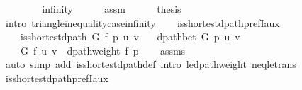 \begin{isabellebody}
\ \ \isamarkupfalse%
\isanewline
\ \ \ \ \isamarkupfalse%
\ infinity\isanewline
\ \ \ \ \isamarkupfalse%
\ assm\isanewline
\ \ \ \ \isamarkupfalse%
\ {\isacharquery}{\kern0pt}thesis\isanewline
\ \ \ \ \ \ \isamarkupfalse%
\ {\isacharparenleft}{\kern0pt}intro\ {\isasymdelta}{\isacharunderscore}{\kern0pt}triangle{\isacharunderscore}{\kern0pt}inequality{\isacharunderscore}{\kern0pt}case{\isacharunderscore}{\kern0pt}infinity{\isacharparenright}{\kern0pt}\isanewline
\ \ \isamarkupfalse%
\isanewline
{}\isamarkupfalse%
%
\endisatagproof
{\isafoldproof}%
%
\isadelimproof
\isanewline
%
\endisadelimproof
%
\isadeliminvisible
\isanewline
%
\endisadeliminvisible
%
\isataginvisible
{}\isamarkupfalse%
\ is{\isacharunderscore}{\kern0pt}shortest{\isacharunderscore}{\kern0pt}dpath{\isacharunderscore}{\kern0pt}prefI{\isacharunderscore}{\kern0pt}aux{\isacharcolon}{\kern0pt}\isanewline
\ \ \ {\isachardoublequoteopen}{\isasymnot}\ is{\isacharunderscore}{\kern0pt}shortest{\isacharunderscore}{\kern0pt}dpath\ G\ f\ p\ u\ v{\isachardoublequoteclose}\isanewline
\ \ \ {\isachardoublequoteopen}dpath{\isacharunderscore}{\kern0pt}bet\ G\ p\ u\ v{\isachardoublequoteclose}\isanewline
\ \ \ {\isachardoublequoteopen}{\isasymdelta}\ G\ f\ u\ v\ {\isacharless}{\kern0pt}\ dpath{\isacharunderscore}{\kern0pt}weight\ f\ p{\isachardoublequoteclose}%
\endisataginvisible
{\isafoldinvisible}%
%
\isadeliminvisible
\isanewline
%
\endisadeliminvisible
%
\isadelimproof
\ \ %
\endisadelimproof
%
\isatagproof
{}\isamarkupfalse%
\ assms\isanewline
\ \ \isamarkupfalse%
\ {\isacharparenleft}{\kern0pt}auto\ simp\ add{\isacharcolon}{\kern0pt}\ is{\isacharunderscore}{\kern0pt}shortest{\isacharunderscore}{\kern0pt}dpath{\isacharunderscore}{\kern0pt}def\ intro{\isacharcolon}{\kern0pt}\ {\isasymdelta}{\isacharunderscore}{\kern0pt}le{\isacharunderscore}{\kern0pt}dpath{\isacharunderscore}{\kern0pt}weight\ neq{\isacharunderscore}{\kern0pt}le{\isacharunderscore}{\kern0pt}trans{\isacharparenright}{\kern0pt}%
\endisatagproof
{\isafoldproof}%
%
\isadelimproof
\isanewline
%
\endisadelimproof
%
\isadeliminvisible
\isanewline
%
\endisadeliminvisible
%
\isataginvisible
{}\isamarkupfalse%
\ is{\isacharunderscore}{\kern0pt}shortest{\isacharunderscore}{\kern0pt}dpath{\isacharunderscore}{\kern0pt}prefI{\isacharunderscore}{\kern0pt}aux{\isacharunderscore}{\kern0pt}{}{\isacharcolon}{\kern0pt}\isanewline

\end{isabellebody}
